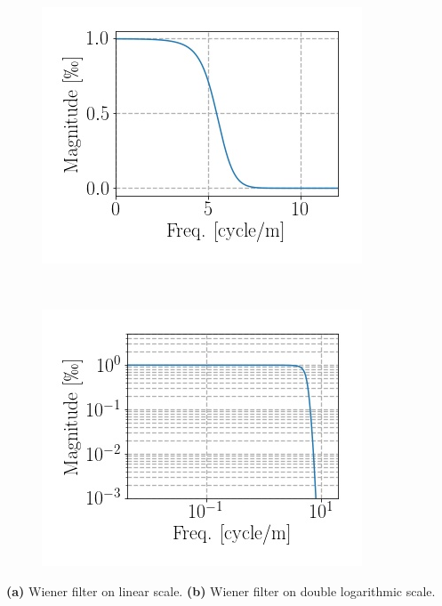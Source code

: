 \documentclass[../../CompleteThesis2/Complete_2ndDraft]{subfiles}
\begin{document}
\begin{marginfigure}
	\centering
	\begin{subfigure}{\marginparwidth}
		\centering
		\includegraphics[width=\textwidth]{SiteA_WienerFilter.jpg}
		\caption{\footnotesize}
		\label{fig:SiteA_WienerFilter}
	\end{subfigure}\\[1ex]
	
	\begin{subfigure}{\marginparwidth}
		\centering
		\includegraphics[width=\textwidth]{SiteA_WienerFilter_loglog.jpg}
		\caption{\footnotesize}
		\label{fig:SiteA_WienerFilter_loglog}
	\end{subfigure}
	\caption[Wiener filter]{\footnotesize\textbf{(a)} Wiener filter on linear scale. \textbf{(b)} Wiener filter on double logarithmic scale.}
	\label{fig:SiteA_WienerFilters}
\end{marginfigure}
\end{document}
